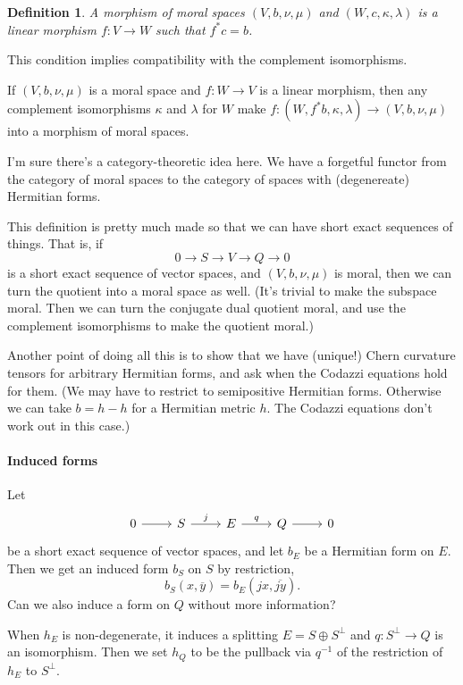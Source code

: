 \documentclass[10pt,a4paper]{article}
\newtheorem{defi}[theo]{Definition}
\def\ov#1{\overline{#1}}
\begin{document}
\begin{defi}
A \emph{morphism} of moral spaces $(V,b,\nu,\mu)$ and $(W,c,\kappa,\lambda)$ is a linear morphism $f : V \to W$ such that $f^*c = b$.
\end{defi}

This condition implies compatibility with the complement isomorphisms.


If $(V,b,\nu,\mu)$ is a moral space and $f : W \to V$ is a linear morphism, then any complement isomorphisms $\kappa$ and $\lambda$ for $W$ make $f : (W,f^*b,\kappa,\lambda) \to (V,b,\nu,\mu)$ into a morphism of moral spaces.

I'm sure there's a category-theoretic idea here. We have a forgetful functor from the category of moral spaces to the category of spaces with (degenereate) Hermitian forms.

This definition is pretty much made so that we can have short exact sequences of things. That is, if
\[
0 \to S \to V \to Q \to 0
\]
is a short exact sequence of vector spaces, and $(V,b,\nu,\mu)$ is moral, then we can turn the quotient into a moral space as well. (It's trivial to make the subspace moral. Then we can turn the conjugate dual quotient moral, and use the complement isomorphisms to make the quotient moral.)

Another point of doing all this is to show that we have (unique!) Chern curvature tensors for arbitrary Hermitian forms, and ask when the Codazzi equations hold for them. (We may have to restrict to semipositive Hermitian forms. Otherwise we can take $b = h - h$ for a Hermitian metric $h$. The Codazzi equations don't work out in this case.)


\paragraph{Induced forms}

Let
\[
\begin{tikzcd}
0 \ar[r] &
S \ar[r,"j"] &
E \ar[r,"q"] &
Q \ar[r] &
0
\end{tikzcd}
\]
be a short exact sequence of vector spaces, and let $b_E$ be a Hermitian form on $E$. Then we get an induced form $b_S$ on $S$ by restriction,
\[
b_S(x,\ov y)
= b_E(jx, \ov{jy}).
\]
Can we also induce a form on $Q$ without more information?

When $h_E$ is non-degenerate, it induces a splitting $E = S \oplus S^\perp$ and $q : S^\perp \to Q$ is an isomorphism. Then we set $h_Q$ to be the pullback via $q^{-1}$ of the restriction of $h_E$ to $S^\perp$.
\end{document}
